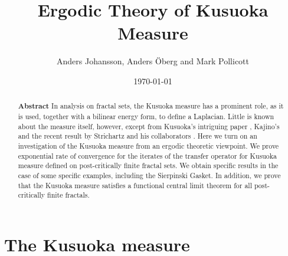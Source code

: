 \documentclass[11pt]{scrartcl}
\theoremstyle{plain} %
\theoremstyle{definition}
\begin{document}
\title{Ergodic Theory of Kusuoka Measure} 
\author{Anders Johansson, Anders \"Oberg and Mark Pollicott}
\date{\today} 
\maketitle
\begin{abstract}
\noindent
{\bf Abstract}\newline
\noindent
In analysis on fractal sets, the Kusuoka measure has a prominent role, as it is used, together with a bilinear energy form, to define a Laplacian. Little is known about the measure itself, however, except from Kusuoka's intriguing paper \cite{kusuoka2}, Kajino's \cite{kajino} and the recent result by Strichartz and his collaborators \cite{str3}. Here we turn on an investigation of the Kusuoka measure from an ergodic theoretic viewpoint. We prove exponential rate of convergence for the iterates of the transfer operator for Kusuoka measure defined on post-critically finite fractal sets. We obtain specific results in the case of some specific examples, including the Sierpinski Gasket. In addition, we prove that the Kusuoka measure satisfies a functional central limit theorem for all post-critically finite fractals. 
\end{abstract}

\section{The Kusuoka measure}
\end{document}
